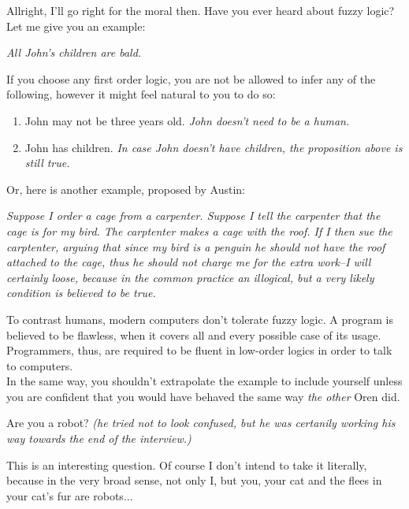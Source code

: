 \documentclass[11pt,a4paper,oneside]{memoir}
\begin{document}
\begin{description}[itemsep=1ex,leftmargin=1cm]
\item[Oleg] Allright, I'll go right for the moral then. Have you ever
  heard about fuzzy logic? Let me give you an example:\\
  \begin{adjustwidth}{24pt}{16pt}
  \textit{All John's children are bald.}\\
  \end{adjustwidth}
  If you choose any first order logic, you are not be allowed to infer
  any of the following, however it might feel natural to you to do so:\\
  \begin{enumerate}
  \item John may not be three years old. \textit{John doesn't need to be
      a human.}
  \item John has children. \textit{In case John doesn't have children,
      the proposition above is still true.}
  \end{enumerate}
  Or, here is another example, proposed by Austin:\\
  \begin{adjustwidth}{24pt}{16pt}
    \textit{Suppose I order a cage from a carpenter. Suppose I tell the
      carpenter that the cage is for my bird. The carptenter makes a
      cage with the roof. If I then sue the carptenter, arguing that since
      my bird is a penguin he should not have the roof attached to the cage,
      thus he should not charge me for the extra work--I will certainly
      loose, because in the common practice an illogical, but a very likely
      condition is believed to be true.\\}
  \end{adjustwidth}
  To contrast humans, modern computers don't tolerate fuzzy logic.
  A program is believed to be flawless, when it covers all and every possible
  case of its usage. Programmers, thus, are required to be fluent in low-order
  logics in order to talk to computers.\\
  In the same way, you shouldn't extrapolate the example to include yourself
  unless you are confident that you would have behaved the same way
  \textit{the other} Oren did.

\item[Ronen] Are you a robot? \textit{(he tried not to look confused, but
    he was certanily working his way towards the end of the interview.)}

\item[Oleg] This is an interesting question. Of course I don't intend to
  take it literally, because in the very broad sense, not only I, but you,
  your cat and the flees in your cat's fur are robots...


\end{description}
\end{document}
